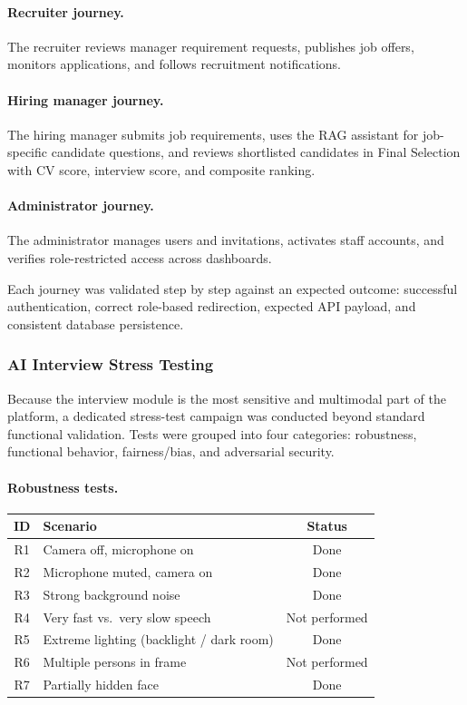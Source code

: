 \paragraph{Recruiter journey.}
The recruiter reviews manager requirement requests, publishes job offers, monitors applications, and follows recruitment notifications.

\paragraph{Hiring manager journey.}
The hiring manager submits job requirements, uses the RAG assistant for job-specific candidate questions, and reviews shortlisted candidates in Final Selection with CV score, interview score, and composite ranking.

\paragraph{Administrator journey.}
The administrator manages users and invitations, activates staff accounts, and verifies role-restricted access across dashboards.

Each journey was validated step by step against an expected outcome: successful authentication, correct role-based redirection, expected API payload, and consistent database persistence.

\subsubsection{AI Interview Stress Testing}
\label{sec:ch5:interview_stress_tests}

Because the interview module is the most sensitive and multimodal part of the platform, a dedicated stress-test campaign was conducted beyond standard functional validation. Tests were grouped into four categories: robustness, functional behavior, fairness/bias, and adversarial security.

\paragraph{Robustness tests.}

\begin{center}
\label{tab:robustness_tests}
\renewcommand{\arraystretch}{1.1}
\begin{tabularx}{\textwidth}{|c|l|c|}
\hline
\rowcolor{gray!20} \textbf{ID} & \textbf{Scenario} & \textbf{Status} \\
\hline
R1 & Camera off, microphone on & Done \\
R2 & Microphone muted, camera on & Done \\
R3 & Strong background noise & Done \\
R4 & Very fast vs.\ very slow speech & Not performed \\
R5 & Extreme lighting (backlight / dark room) & Done \\
R6 & Multiple persons in frame & Not performed \\
R7 & Partially hidden face & Done \\
\hline
\end{tabularx}
\end{center}

